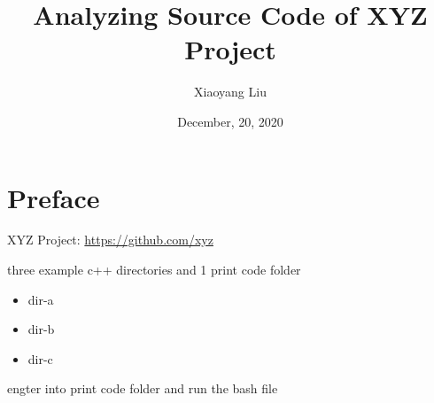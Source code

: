 \title{Analyzing Source Code of XYZ Project}
\author{Xiaoyang Liu}
\date{December, 20, 2020}
\maketitle
\tableofcontents

\chapter*{Preface}
\noindent XYZ Project: \url{https://github.com/xyz} \par 
\noindent three example c++ directories and 1 print code folder
\begin{itemize}
  \item dir-a
  \item dir-b
  \item dir-c
\end{itemize}
\noindent engter into print code folder and run the bash file
